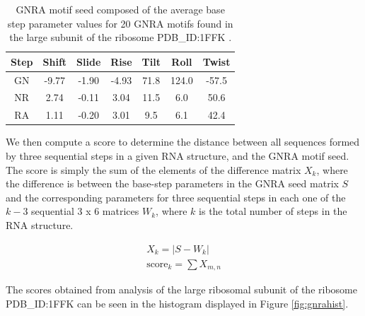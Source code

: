 \begin{table}[hb]  
\begin{center}
\begin{tabular}{|c|c|c|c|c|c|c|}
\hline
Step & Shift & Slide & Rise & Tilt & Roll & Twist \\
\hline
GN & -9.77 & -1.90 & -4.93 & 71.8 & 124.0 & -57.5 \\
NR & 2.74 & -0.11 & 3.04 & 11.5 & 6.0 & 50.6 \\
RA & 1.11 & -0.20 & 3.01 & 9.5 & 6.1 & 42.4 \\
\hline
\end{tabular}
\caption{GNRA motif  seed composed of the average  base step parameter
  values for 20 GNRA motifs found in the large subunit of the ribosome
  PDB\_ID:1FFK \cite{lemieux2006}.}
\label{tab:seed}
\end{center}
\end{table}

We  then  compute  a  score  to determine  the  distance  between  all
sequences formed by  three sequential steps in a  given RNA structure,
and the GNRA  motif seed. The score is simply the  sum of the elements
of the difference matrix $X_{k}$,  where the difference is between the
base-step parameters in the GNRA seed matrix $S$ and the corresponding
parameters  for  three sequential  steps  in  each  one of  the  $k-3$
sequential 3  x 6 matrices $W_{k}$,  where $k$ is the  total number of
steps in the RNA structure.

\begin{gather}
X_{k} = |S - W_{k}| \\
\text{score}_{k} = \sum X_{m,n} 
\end{gather}  

The scores  obtained from analysis  of the large ribosomal  subunit of
the  ribosome PDB\_ID:1FFK  can be  seen in  the histogram  displayed in
Figure \ref{fig:gnrahist}.

